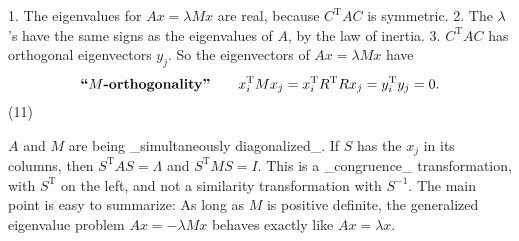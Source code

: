 1. The eigenvalues for \(Ax=\lambda Mx\) are real, because \(C^{\mathrm{T}}AC\) is symmetric.
2. The \(\lambda\)'s have the same signs as the eigenvalues of \(A\), by the law of inertia.
3. \(C^{\mathrm{T}}AC\) has orthogonal eigenvectors \(y_{j}\). So the eigenvectors of \(Ax=\lambda Mx\) have \[\text{\bf``$M$-orthogonality''}\qquad x_{i}^{\mathrm{T}}Mx_{j}=x_{i}^{\mathrm{T} }R^{\mathrm{T}}Rx_{j}=y_{i}^{\mathrm{T}}y_{j}=0.\] (11)

\(A\) and \(M\) are being _simultaneously diagonalized_. If \(S\) has the \(x_{j}\) in its columns, then \(S^{\mathrm{T}}AS=\Lambda\) and \(S^{\mathrm{T}}MS=I\). This is a _congruence_ transformation, with \(S^{\mathrm{T}}\) on the left, and not a similarity transformation with \(S^{-1}\). The main point is easy to summarize: As long as \(M\) is positive definite, the generalized eigenvalue problem \(Ax=-\lambda Mx\) behaves exactly like \(Ax=\lambda x\).

 